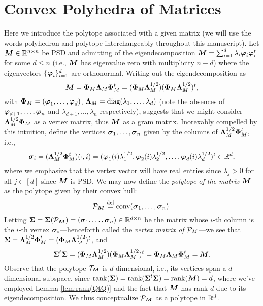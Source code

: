 \section{Convex Polyhedra of Matrices}
\label{sec:correspondence_polyhedra_matrices}
Here we introduce the polytope associated with a given matrix  (we will use  the words polyhedron and polytope interchangeably throughout this manuscript). Let $\M\in \R^{n\times n}$ be PSD and admitting of the eigendecomposition $\M=\sum_{i=1}^d \lambda_i \eig_i\eig_i^\tp$ for some $d\leq n$ (i.e., $\M$ has eigenvalue zero with multiplicity $n-d$) where the eigenvectors $\{\eig_i\}_{i=1}^d $ are orthonormal. Writing out the eigendecomposition as 
\begin{equation*}
\M=\Eig_M\Eval_M\Eig_M^\tp=(\Eig_M\Eval_M^{1/2})(\Eig_M\Eval_M^{1/2})^\tp,
\end{equation*}
with $\Eig_M = (\vp_1,\dots,\vp_d)$, $\Eval_M=\diag(\lambda_1,\dots,\lambda_d)$ (note the absences of $\vp_{d+1},\dots,  \vp_n$ and $\lambda_{d+1},\dots,\lambda_n$ respectively), suggests that we might consider $\Eval_M^{1/2}\Eig_M$ as a vertex matrix, thus $\M$ as a gram matrix. 
Inorexably compelled by this intuition, define the vertices $\sv_1,\dots,\sv_n$ given by the columns of $\Eval_M^{1/2}\Eig_M^\tp$, i.e.,  
\begin{equation*}
    \sv_i = (\Eval_M^{1/2}\Eig_M^\tp) (\cdot,i) = (\eig_1(i)\lambda_1^{1/2}, \eig_2(i)\lambda_2^{1/2},\dots,\eig_d(i)\lambda_d^{1/2})^\tp\in \R^d,
\end{equation*}
where we emphasize that the vertex vector will have real entries since $\lambda_j> 0$ for all $j\in[d]$ since  $\M$ is PSD. We may now define the \emph{polytope of the matrix $\M$} as the polytope given by their convex hull:
\begin{equation*}
\pol_\M\equiv \conv(\sv_1,\dots,\sv_n).
\end{equation*}
Letting $\Sv=\Sv(\pol_\M)=(\sv_1,\dots,\sv_n)\in \R^{d\times n}$ be the matrix whose $i$-th column is the $i$-th vertex $\sv_i$---henceforth called the \emph{vertex matrix of $\P_M$}---we see that 
$ \Sv=\Eval_M^{1/2}\Eig_M^\tp=(\Eig_M\Eval_M^{1/2})^\tp$, and 
\begin{equation*}
    \Sv^\tp \Sv=(\Eig_M\Eval_M^{1/2}) (\Eig_M\Eval_M^{1/2})^\tp = \Eig_M \Eval_M\Eig_M^\tp =\M.
\end{equation*}
Observe that the polytope $\ssplx_\M$ is $d$-dimensional, i.e., its vertices span a $d$-dimensional subspace, since
$\rank(\Sv)=\rank(\Sv^\tp \Sv)=\rank(\M)=d$, 
where we've employed Lemma \ref{lem:rank(QtQ)} and the fact that $\M$ has rank $d$ due to its eigendecomposition. We thus conceptualize $\P_\M$ as a polytope in $\R^d$. 

